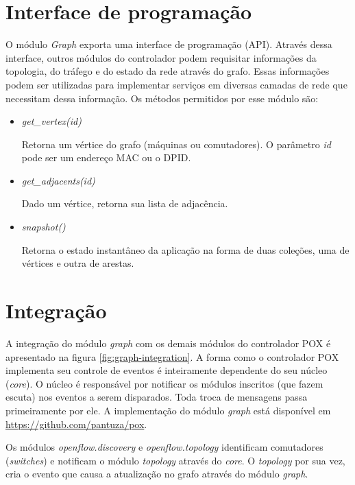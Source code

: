 \section{Interface de programação}

O módulo \emph{Graph} exporta uma interface de programação (API).
Através dessa interface, outros módulos do controlador podem requisitar
informações da topologia, do tráfego e do estado da rede através do grafo.
Essas informações podem ser utilizadas para implementar serviços em diversas
camadas de rede que necessitam dessa informação.
Os métodos permitidos por esse módulo são:

\begin{itemize}
    \item \emph{get\_vertex(id)}

        Retorna um vértice do grafo (máquinas ou comutadores).
        O parâmetro \emph{id} pode ser um endereço MAC ou o DPID.

    \item \emph{get\_adjacents(id)}

        Dado um vértice, retorna sua lista de adjacência.

    \item \emph{snapshot()}

        Retorna o estado instantâneo da aplicação na forma de duas coleções,
        uma de vértices e outra de arestas.
\end{itemize}

\section{Integração}

A integração do módulo \emph{graph} com os demais módulos do controlador POX
é apresentado na figura \ref{fig:graph-integration}.
A forma como o controlador POX implementa seu controle de eventos é
inteiramente dependente do seu núcleo (\emph{core}).
O núcleo é responsável por notificar os módulos inscritos (que fazem escuta)
nos eventos a serem disparados.
Toda troca de mensagens passa primeiramente por ele.
A implementação do módulo \emph{graph} está disponível em
\url{https://github.com/pantuza/pox}.

Os módulos \emph{openflow.discovery} e \emph{openflow.topology} identificam
comutadores (\emph{switches}) e notificam o módulo \emph{topology} através do
\emph{core}.
O \emph{topology} por sua vez, cria o evento que causa a atualização no grafo
através do módulo \emph{graph}.

